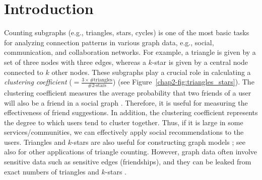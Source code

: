 \section{Introduction}
\label{chap2-sec:intro}
Counting subgraphs (e.g., triangles, stars, cycles) is
one of the most basic tasks 
for analyzing connection patterns
in
various graph data, e.g., social,
communication, and collaboration networks.
For example,
a triangle is given by a set of three nodes with three edges, whereas a $k$-star is given by a central node connected to $k$ other nodes.
These subgraphs
play a crucial role in calculating
a \textit{clustering coefficient} ($=\frac{3 \times \text{\#triangles}}{\text{\#2-stars}}$) (see Figure~\ref{chap2-fig:triangles_stars}). 
The clustering coefficient 
measures the average probability that
two friends of a user will also be a friend
in a social graph \cite{Newman_PRL09}. 
Therefore, it is useful for measuring the effectiveness of friend suggestions. 
In addition, the clustering coefficient represents the degree to which users tend to cluster together. 
Thus, if it is large in some services/communities, we can effectively apply social recommendations \cite{Kolluri_CCS21} to the users. 
Triangles 
and $k$-stars 
are also useful for 
constructing
graph models
\cite{Robins_SN07,Jorgensen_SIGMOD16}; 
see also \cite{Tsourakakis_JGAA11} for other applications of triangle counting. 
However, graph data often involve sensitive data such as sensitive edges (friendships),
and they 
can be leaked from 
exact numbers of triangles and $k$-stars \cite{Imola_USENIX21}.


